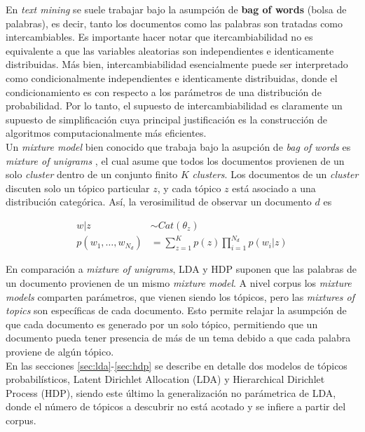 \documentclass[letterpaper,12pt,oneside]{book} %
\begin{document}
En \textit{text mining} se suele trabajar bajo la asumpción de \textbf{bag of words} (bolsa de palabras), es decir, tanto los documentos como las palabras son tratadas como intercambiables. Es importante hacer notar que itercambiabilidad no es equivalente a que las variables aleatorias son independientes e identicamente distribuidas. Más bien, intercambiabilidad esencialmente puede ser interpretado como condicionalmente independientes e identicamente distribuidas, donde el condicionamiento es con respecto a los parámetros de una distribución de probabilidad. Por lo tanto, el supuesto de intercambiabilidad es claramente un supuesto de simplificación cuya principal justificación es la construcción de algoritmos computacionalmente más eficientes.\\

Un \textit{mixture model} bien conocido que trabaja bajo la asupción de \textit{bag of words} es \textit{mixture of unigrams} \citep{nigam2000text}, el cual asume que todos los documentos provienen de un solo \textit{cluster} dentro de un conjunto finito $K$ \textit{clusters}. Los documentos de un \textit{cluster} discuten solo un tópico particular $z$, y cada tópico $z$ está asociado a una distribución categórica. Así, la verosimilitud de observar un documento $d$ es

\begin{align}
    w|z &\sim Cat(\theta_{z})\\
    p(w_{1}, \ldots, w_{N_{d}}) &= \sum_{z=1}^{K}p(z)\prod_{i=1}^{N_{d}}p(w_{i}|z)
\end{align}

En comparación a \textit{mixture of unigrams}, LDA y HDP suponen que las palabras de un documento provienen de un mismo \textit{mixture model}. A nivel corpus los \textit{mixture models} comparten parámetros, que vienen siendo los tópicos, pero las \textit{mixtures of topics} son específicas de cada documento. Esto permite relajar la asumpción de que cada documento es generado por un solo tópico, permitiendo que un documento pueda tener presencia de más de un tema debido a que cada palabra proviene de algún tópico.\\

En las secciones \ref{sec:lda}-\ref{sec:hdp} se describe en detalle dos modelos de tópicos probabilísticos, Latent Dirichlet Allocation (LDA) y Hierarchical Dirichlet Process (HDP), siendo este último la generalización no parámetrica de LDA, donde el número de tópicos a descubrir no está acotado y se infiere a partir del corpus.\\
\end{document}
